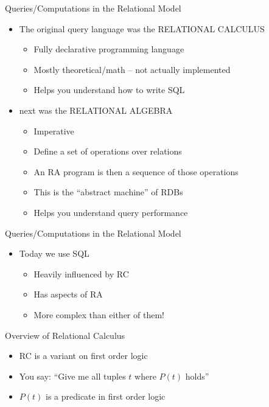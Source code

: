 \documentclass[aspectratio=169]{beamer}
\newenvironment{noindentitemize}
{ \begin{itemize}
 \setlength{\itemsep}{1.5ex}
  \setlength{\parsep}{0pt}   
  \setlength{\parskip}{0pt}
 \addtolength{\leftskip}{-2em}
 }
{ \end{itemize} }
\newenvironment{noindentitemize2}
{ \begin{itemize}
  \setlength{\itemsep}{0ex}
  \setlength{\parskip}{0pt}
  \setlength{\parsep}{0pt}   
  \addtolength{\leftskip}{-2em}  }
{ \end{itemize} }
\begin{document}
\begin{frame}{Queries/Computations in the Relational Model}

\begin{noindentitemize}
\item The original query language was the RELATIONAL CALCULUS
	\begin{noindentitemize2}
	\item Fully declarative programming language
	\item Mostly theoretical/math  -- not actually implemented
	\item Helps you understand how to write SQL
	\end{noindentitemize2}
\item next was the RELATIONAL ALGEBRA
	\begin{noindentitemize2}
	\item Imperative
	\item Define a set of operations over relations
	\item An RA program is then a sequence of those operations
	\item This is the ``abstract machine'' of RDBs
	\item Helps you understand query performance
	\end{noindentitemize2}
\end{noindentitemize}
\end{frame}
\begin{frame}{Queries/Computations in the Relational Model}
\begin{noindentitemize}
\item Today we use SQL
	\begin{noindentitemize2}
	\item Heavily influenced by RC
	\item Has aspects of RA
	\item More complex than either of them!
	\end{noindentitemize2}
\end{noindentitemize}

\end{frame}

\begin{frame}{Overview of Relational Calculus}

\begin{itemize}
\item RC is a variant on first order logic
\item You say: ``Give me all tuples $t$ where $P(t)$ holds''
\item $P(t)$ is a predicate in first order logic
\end{itemize}
\end{frame}
\end{document}
